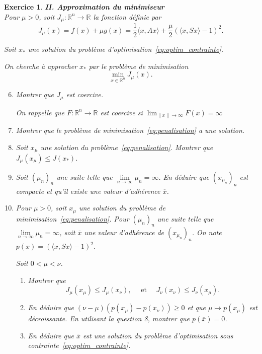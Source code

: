 \documentclass[11pt]{article}
\newcommand{\bR}{\mathbb R}
\theoremstyle{exostyle}
\newtheorem{exercice}{Exercice}
\begin{document}
\begin{exercice}
{\bf II. Approximation du minimiseur} \\
Pour $\mu>0$, soit $J_\mu : \bR^n \to \bR$ la fonction définie par 
\[
  J_\mu(x) = f(x) + \mu g(x) =  \frac{1}{2} \langle x, A x \rangle + \frac{\mu}{2} (\langle x, S x \rangle-1)^2.
\]

Soit $x_*$ une solution du problème d’optimisation~\eqref{eq:optim_contrainte}.


On cherche à approcher $x_*$ par le problème de minimisation 
\begin{equation}
  \label{eq:penalisation}
  \min_{x \in \bR^n} J_\mu(x).
\end{equation}
%
\begin{enumerate}
\setcounter{enumi}{5}
%
  \item Montrer que $J_\mu$ est coercive.
  

  \emph{On rappelle que $F : \bR^n \to \bR$ est coercive si $\lim_{\|x\| \to \infty} F(x) = \infty$}

  \item Montrer que le problème de minimisation~\eqref{eq:penalisation} a une solution.
  
  \item Soit $x_\mu$ une solution du problème~\eqref{eq:penalisation}. Montrer que $J_\mu(x_\mu) \leq J(x_*)$.

  \item Soit $(\mu_n)_n$ une suite telle que $\lim\limits_{n \to \infty} \mu_n = \infty$.
  En déduire que $(x_{\mu_n})_{n}$ est compacte et qu’il existe une valeur d’adhérence $\overline{x}$.

  \item Pour $\mu>0$, soit $x_\mu$ une solution du problème de minimisation~\eqref{eq:penalisation}.
  Pour $(\mu_n)_n$ une suite telle que $\lim\limits_{n \to \infty} \mu_n = \infty$, soit $\overline{x}$ une valeur d’adhérence de $(x_{\mu_n})_n$.
  On note $p(x) =  (\langle x, S x \rangle-1)^2.$

  Soit $0 < \mu < \nu$.
  \begin{enumerate}
    \item Montrer que 
    \[
      J_{\mu}(x_\mu) \leq  J_{\mu}(x_{\nu}), \quad \text{ et } \quad J_{\nu}(x_\nu) \leq  J_{\nu}(x_{\mu}).
    \]
    \item En déduire que $(\nu - \mu) (p(x_\mu)-p(x_\nu)) \geq 0$ et que $\mu \mapsto p(x_\mu)$ est décroissante.
    En utilisant la question 8, montrer que $p(\overline{x}) = 0$.
    \item En déduire que $\overline{x}$ est une solution du problème d’optimisation sous contrainte~\eqref{eq:optim_contrainte}.
  \end{enumerate}
\end{enumerate}
\end{exercice}
\end{document}
